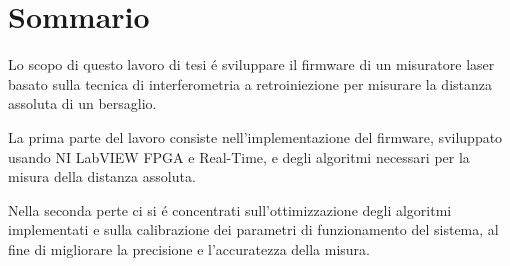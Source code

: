 \newpage
\chapter*{Sommario}

Lo scopo di questo lavoro di tesi \'e sviluppare il firmware di un misuratore laser basato sulla tecnica di interferometria a retroiniezione per misurare la distanza assoluta di un bersaglio.

La prima parte del lavoro consiste nell'implementazione del firmware, sviluppato usando NI LabVIEW FPGA e Real-Time, e degli algoritmi necessari per la misura della distanza assoluta.

Nella seconda perte ci si \'e concentrati sull'ottimizzazione degli algoritmi implementati e sulla calibrazione dei parametri di funzionamento del sistema, al fine di migliorare la precisione e l'accuratezza della misura.
